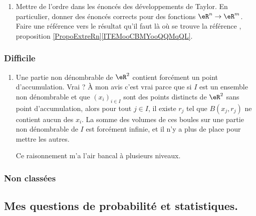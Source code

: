 \begin{enumerate}
    \item
        Mettre de l'ordre dans les énoncés des développements de Taylor. En particulier, donner des énoncés corrects pour des fonctions \( \eR^n\to \eR^m\). Faire une référence vers le résultat qu'il faut là où se trouve la référence , proposition \ref{PropoExtreRn}\ref{ITEMooCBMYooQQMqQL}.
\end{enumerate}

\subsubsection{Difficile}

\begin{enumerate}
    \item
        Une partie non dénombrable de \( \eR^2\) contient forcément un point d'accumulation. Vrai ? À mon avis c'est vrai parce que si \( I\) est un ensemble non dénombrable et que \( (x_i)_{i\in I}\) sont des points distincts de \( \eR^2\) sans point d'accumulation, alors pour tout \( j\in I\), il existe \( r_j\) tel que \( B(x_j,r_j)\) ne contient aucun des \( x_i\). La somme des volumes de ces boules sur une partie non dénombrable de $I$ est forcément infinie, et il n'y a plus de place pour mettre les autres.

        Ce raisonnement m'a l'air bancal à plusieurs niveaux.
\end{enumerate}

\subsubsection{Non classées}


\subsection{Mes questions de probabilité et statistiques.}

